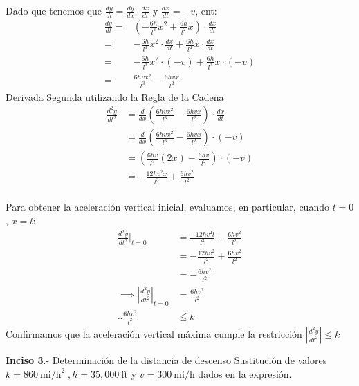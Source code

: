 Dado que tenemos que $\frac{dy}{dt} = \frac{dy}{dx} \cdot \frac{dx}{dt}$ y $\frac{dx}{dt}=-v$, ent:
\begin{align*}
	\frac{dy}{dt} = & \left(-\frac{6h}{l^3} x^2 + \frac{6h}{l^2} x\right) \cdot \frac{dx}{dt}      \\
	=               & -\frac{6h}{l^3} x^2\cdot \frac{dx}{dt} + \frac{6h}{l^2} x\cdot \frac{dx}{dt} \\
	=               & -\frac{6h}{l^3} x^2\cdot (-v) + \frac{6h}{l^2} x\cdot (-v)                   \\
	=               & \frac{6h v x^2}{l^3} - \frac{6h v x}{l^2}
\end{align*}
Derivada Segunda utilizando la Regla de la Cadena
\begin{align*}
	\frac{d^2 y}{d t^2} & = \frac{d}{dx} \left( \frac{6h v x^2}{l^3} - \frac{6h v x}{l^2} \right) \cdot \frac{dx}{dt} \\
	                    & = \frac{d}{dx} \left( \frac{6hvx^2}{l^3} - \frac{6hvx}{l^2} \right) \cdot (-v)              \\
	                    & =  \left(\frac{6hv}{l^3}(2x) - \frac{6hv}{l^2}\right)\cdot (-v)                             \\
	                    & = -\frac{12hv^2x}{l^3} + \frac{6hv^2}{l^2}                                                  \\
\end{align*}

Para obtener la aceleración vertical inicial, evaluamos, en particular, cuando $t = 0$, $x = l$:
\begin{align*}
	\frac{d^2 y}{d t^2} \Bigg|_{t=0}                  & = \frac{-12h v^2 l}{l^3} + \frac{6h v^2}{l^2} \\
	                                                  & = -\frac{12h v^2}{l^2} + \frac{6h v^2}{l^2}   \\
	                                                  & = -\frac{6h v^2}{l^2}                         \\
	\implies \left| \frac{d^2 y}{d t^2} \right|_{t=0} & = \frac{6 h v^2}{l^2}                         \\
	\therefore \frac{6 h v^2}{l^2}                    & \leq  k
\end{align*}
Confirmamos que la aceleración vertical máxima cumple la restricción $\left| \frac{d^2 y}{d t^2} \right| \leq k$

\textbf{Inciso 3}.- Determinación de la distancia de descenso
Sustitución de valores $k = 860 \ \mathrm{mi/h^2}\;, h = 35,000 \ \mathrm{ft} \text{ y }v = 300 \ \mathrm{mi/h}$ dados en la expresión.

